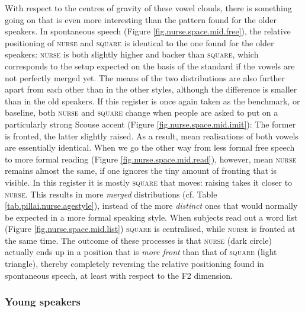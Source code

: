 With respect to the centres of gravity of these vowel clouds, there is something going on that is even more interesting than the pattern found for the older speakers.
In spontaneous speech (Figure \ref{fig.nurse.space.mid.free}), the relative positioning of \textsc{nurse} and \textsc{square} is identical to the one found for the older speakers: \textsc{nurse} is both slightly higher and backer than \textsc{square}, which corresponds to the setup expected on the basis of the standard if the vowels are not perfectly merged yet.
The means of the two distributions are also further apart from each other than in the other styles, although the difference is smaller than in the old speakers.
If this register is once again taken as the benchmark, or baseline, both \textsc{nurse} and \textsc{square} change when people are asked to put on a particularly strong Scouse accent (Figure \ref{fig.nurse.space.mid.imit}): The former is fronted, the latter slightly raised.
As a result, mean realisations of both vowels are essentially identical.
When we go the other way from less formal free speech to more formal reading (Figure \ref{fig.nurse.space.mid.read}), however, mean \textsc{nurse} remains almost the same, if one ignores the tiny amount of fronting that is visible.
In this register it is mostly \textsc{square} that moves: raising takes it closer to \textsc{nurse}.
This results in more \emph{merged} distributions (cf. Table \ref{tab.pillai.nurse.agestyle}), instead of the more \emph{distinct} ones that would normally be expected in a more formal speaking style.
When subjects read out a word list (Figure \ref{fig.nurse.space.mid.list}) \textsc{square} is centralised, while \textsc{nurse} is fronted at the same time.
The outcome of these processes is that \textsc{nurse} (dark circle) actually ends up in a position that is \emph{more front} than that of \textsc{square} (light triangle), thereby completely reversing the relative positioning found in spontaneous speech, at least with respect to the F2 dimension.

\subsubsection{Young speakers}

